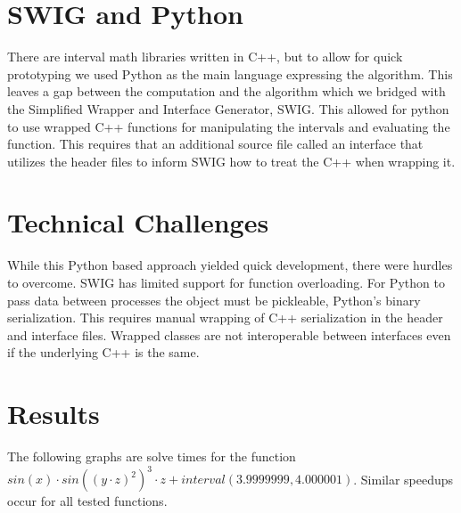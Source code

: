 \documentclass{acm_proc_article-sp}
\begin{document}
\balancecolumns

\section{SWIG and Python}
There are interval math libraries written in C++, but to allow for quick prototyping we used Python as the main language expressing the algorithm. This leaves a gap between the computation and the algorithm which we bridged with the Simplified Wrapper and Interface Generator, SWIG\@. This allowed for python to use wrapped C++ functions for manipulating the intervals and evaluating the function. This requires that an additional source file called an interface that utilizes the header files to inform SWIG how to treat the C++ when wrapping it.

\section{Technical Challenges}
While this Python based approach yielded quick development, there were hurdles to overcome. SWIG has limited support for function overloading. For Python to pass data between processes the object must be pickleable, Python's binary serialization. This requires manual wrapping of C++ serialization in the header and interface files. Wrapped classes are not interoperable between interfaces even if the underlying C++ is the same. 

\section{Results}
The following graphs are solve times for the function $sin(x)\cdot {sin({(y\cdot z)}^2)}^{3}\cdot z+interval(3.9999999,4.000001)$. Similar speedups occur for all tested functions.
\end{document}
